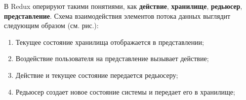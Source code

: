 В Redux оперируют такими понятиями, как \textbf{действие}, \textbf{хранилище}, \textbf{редьюсер}, \textbf{представление}. Схема взаимодействия элементов потока данных выглядит следующим образом (см. рис.):

\begin{enumerate}
	\item Текущее состояние хранилища отображается в представлении;
	\item Воздействие пользователя на представление вызывает действие;
	\item Действие и текущее состояние передается редьюсеру;
	\item Редьюсер создает новое состояние системы и передает его в хранилище;
\end{enumerate}
